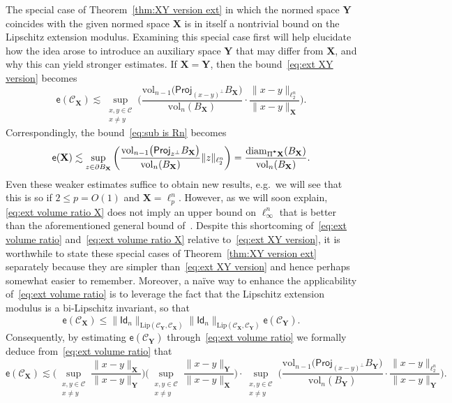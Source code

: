 \documentclass[11pt,reqno]{amsart}
\renewcommand{\le}{\leqslant}
\newcommand{\diam}{\mathrm{diam}}
\newcommand{\proj}{\mathsf{Proj}}
\newcommand{\X}{\mathbf X}
\newcommand{\Y}{\mathbf Y}
\theoremstyle{remark}
\newcommand{\Lip}{\mathrm{Lip}}
\newcommand{\ee}{\mathsf{e}}
\newcommand{\sub}{\mathscr{C}}
\newcommand{\vol}{\mathrm{vol}}
\renewcommand{\1}{\mathbf 1}
\begin{document}
The special case of Theorem~\ref{thm:XY version ext} in which the normed space $\Y$  coincides with the given normed space $\X$  is in itself a nontrivial bound on the Lipschitz extension modulus. Examining this special case first will help elucidate how the idea arose to introduce an auxiliary space $\Y$ that may differ from $\X$, and why this can yield stronger estimates. If $\X=\Y$, then the bound~\eqref{eq:ext XY version} becomes
\begin{equation}\label{eq:ext volume ratio}
\ee(\sub_{\X})\lesssim \sup_{\substack{x,y\in \sub\\x\neq y}} \bigg( \frac{\vol_{n-1}\big(\proj_{(x-y)^\perp}B_{\X}\big)}{\vol_n(B_{\X})}\cdot \frac{\|x-y\|_{\ell_2^n}}{\|x-y\|_{\X}}\bigg).
\end{equation}
Correspondingly, the bound~\eqref{eq:sub is Rn} becomes
\begin{equation}\label{eq:ext volume ratio X}
\ee(\X)\lesssim \sup_{z\in \partial B_{\X}}\bigg( \frac{\vol_{n-1}\big(\proj_{z^\perp}B_{\X}\big)}{\vol_n(B_{\X})}\|z\|_{\ell_2^n}\bigg)=\frac{\diam_{\Pi^{\textbf *} \X}(B_\X)}{\vol_n(B_\X)}.
\end{equation}
Even these weaker estimates suffice to obtain new results, e.g.~we will see that this is so if $2\le p=O(1)$ and $\X=\ell_p^n$. However,  as we will soon explain, \eqref{eq:ext volume ratio X} does not imply an upper bound on $\ell_\infty^n$ that is better than the aforementioned general bound of~\cite{JLS86}. Despite this shortcoming of~\eqref{eq:ext volume ratio} and~\eqref{eq:ext volume ratio X} relative to~\eqref{eq:ext XY version}, it is worthwhile to state these special cases of Theorem~\ref{thm:XY version ext} separately because they are simpler than~\eqref{eq:ext XY version} and hence perhaps somewhat easier to remember. Moreover, a na\"ive way to enhance the applicability of~\eqref{eq:ext volume ratio}  is to leverage the fact that the Lipschitz extension modulus is a bi-Lipschitz invariant, so that
 $$\ee(\sub_{\X})\le \|\mathsf{Id}_n\|_{\Lip(\sub_{\Y},\sub_{\X})} \|\mathsf{Id}_n\|_{\Lip(\sub_{\X},\sub_{\Y})}\ee(\sub_{\Y}).$$ Consequently, by estimating $\ee(\sub_{\Y})$ through~\eqref{eq:ext volume ratio} we formally deduce from~\eqref{eq:ext volume ratio} that
\begin{equation}\label{eq:use bi lip in simpler}
\ee(\sub_{\X})\lesssim \bigg( \sup_{\substack{x,y\in \sub\\x\neq y}}\frac{\|x-y\|_{\X}}{\|x-y\|_{\Y}}\bigg)\bigg( \sup_{\substack{x,y\in \sub\\x\neq y}}\frac{\|x-y\|_{\Y}}{\|x-y\|_{\X}}\bigg)\cdot\sup_{\substack{x,y\in \sub\\x\neq y}} \bigg(\frac{\vol_{n-1}\big(\proj_{(x-y)^\perp}B_{\Y}\big)}{\vol_n(B_{\Y})}\cdot \frac{\|x-y\|_{\ell_2^n}}{\|x-y\|_{\Y}}\bigg).
\end{equation}
\end{document}
